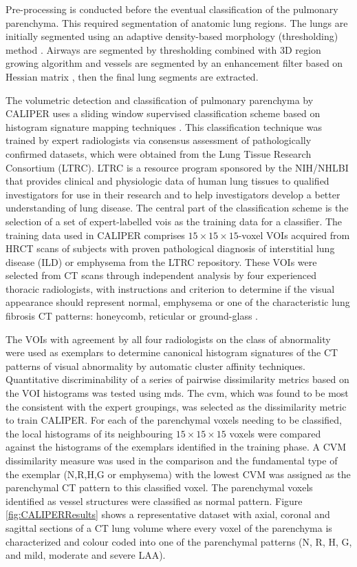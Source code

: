 Pre-processing is conducted before the eventual classification of the pulmonary parenchyma. This required segmentation of anatomic lung regions. The lungs are initially segmented using an adaptive density-based morphology (thresholding) method \citep{hu2001automatic}. Airways are segmented by thresholding combined with 3D region growing algorithm and vessels are segmented by an enhancement filter based on Hessian matrix \citep{sato2000tissue}, then the final lung segments are extracted. 

The volumetric detection and classification of pulmonary parenchyma by CALIPER uses a sliding window supervised classification scheme based on histogram signature mapping techniques \citep{zavaletta2007high}. This classification technique was trained by expert radiologists via consensus assessment of pathologically confirmed datasets, which were obtained from the Lung Tissue Research Consortium (LTRC). LTRC is a resource program sponsored by the NIH/NHLBI that provides clinical and physiologic data of human lung tissues to qualified investigators for use in their research and to help investigators develop a better understanding of lung disease. The central part of the classification scheme is the selection of a set of expert-labelled \gls{vois} as the training data for a classifier. The training data used in CALIPER comprises $15 \times 15 \times 15$-voxel VOIs acquired from HRCT scans of subjects with proven pathological diagnosis of interstitial lung disease (ILD) or emphysema from the LTRC repository. These VOIs were selected from CT scans through independent analysis by four experienced thoracic radiologists, with instructions and criterion to determine if the visual appearance should represent normal, emphysema or one of the characteristic lung fibrosis CT patterns: honeycomb, reticular or ground-glass \citep{maldonado2013automated,bartholmai2013quantitative}.

The VOIs with agreement by all four radiologists on the class of abnormality were used as exemplars to determine canonical histogram signatures of the CT patterns of visual abnormality by automatic cluster affinity techniques. Quantitative discriminability of a series of pairwise dissimilarity metrics based on the VOI histograms was tested using \gls{mds}. The \gls{cvm}, which was found to be most the consistent with the expert groupings, was selected as the dissimilarity metric to train CALIPER. For each of the parenchymal voxels needing to be classified, the local histograms of its neighbouring $15 \times 15 \times 15$ voxels were compared against the histograms of the exemplars identified in the training phase. A CVM dissimilarity measure was used in the comparison and the fundamental type of the exemplar (N,R,H,G or emphysema) with the lowest CVM was assigned as the parenchymal CT pattern to this classified voxel. The parenchymal voxels identified as vessel structures were classified as normal pattern. Figure \ref{fig:CALIPERResults} shows a representative dataset with axial, coronal and sagittal sections of a CT lung volume where every voxel of the parenchyma is characterized and colour coded into one of the parenchymal patterns (N, R, H, G, and mild, moderate and severe LAA). 

